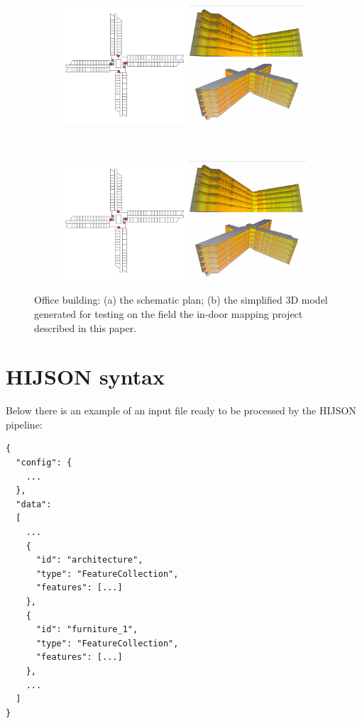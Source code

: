 \documentclass{sig-alternate}
\begin{document}
\begin{figure}[!h]
  \centering
  \begin{subfigure}[b]{0.48\linewidth}
    \includegraphics[width=\textwidth]{images/sogei-a} 
    \caption{}
    \label{fig:sogei-a}
  \end{subfigure}
  ~
  \begin{subfigure}[b]{0.48\linewidth}
    \includegraphics[width=\textwidth]{images/sogei-b}
    \caption{}
    \label{fig:sogei-b}
  \end{subfigure}
  
  \caption{Office building: 
      (a) the schematic plan; 
      (b) the simplified 3D model generated for testing on the field 
        the in-door mapping project described in this paper.
  }
  \label{fig:sogei}
\end{figure}

\section{HIJSON syntax}\label{hijson-syntax}

Below there is an example of an input file ready to be processed by the HIJSON pipeline:

\begin{verbatim}
{
  "config": {
    ...
  },
  "data": 
  [
    ...
    {
      "id": "architecture",
      "type": "FeatureCollection",
      "features": [...] 
    },
    {
      "id": "furniture_1",
      "type": "FeatureCollection",
      "features": [...] 
    },
    ...
  ]
}
\end{verbatim}
\end{document}
